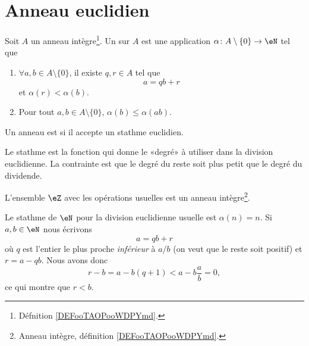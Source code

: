 \section{Anneau euclidien}

\begin{definition} \label{DefAXitWRL}
    Soit \( A\) un anneau intègre\footnote{Défnition \ref{DEFooTAOPooWDPYmd}.}. Un  sur \( A\) est une application \( \alpha\colon A\setminus\{ 0 \}\to \eN\) tel que
	\begin{enumerate}
		\item       \label{ITEMooLVJAooLpjgEz}
		      \( \forall a,b\in A\setminus\{ 0 \}\), il existe \( q,r\in A\) tel que
		      \begin{equation}
			      a=qb+r
		      \end{equation}
		      et \( \alpha(r)<\alpha(b)\).
		\item
		      Pour tout \( a,b\in A\setminus\{ 0 \}\), \( \alpha(b)\leq \alpha(ab)\).
	\end{enumerate}
	Un anneau est  si il accepte un stathme euclidien.
\end{definition}
Le stathme est la fonction qui donne le «degré» à utiliser dans la division euclidienne. La contrainte est que le degré du reste soit plus petit que le degré du dividende.

\begin{lemma}       \label{LEMooFUSTooDCcBDb}
	L'ensemble \( \eZ\) avec les opérations usuelles est un anneau intègre\footnote{Anneau intègre, définition \ref{DEFooTAOPooWDPYmd}.}.
\end{lemma}

\begin{example} \label{ExwqlCwvV}
	Le stathme de \( \eN\) pour la division euclidienne usuelle est \( \alpha(n)=n\). Si \( a,b\in \eN\) nous écrivons
	\begin{equation}
		a=qb+r
	\end{equation}
	où \( q\) est l'entier le plus proche \emph{inférieur} à \( a/b\) (on veut que le reste soit positif) et \( r=a-qb\). Nous avons donc
	\begin{equation}
		r-b=a-b(q+1)<a-b\frac{ a }{ b }=0,
	\end{equation}
	ce qui montre que \( r<b\).
\end{example}

